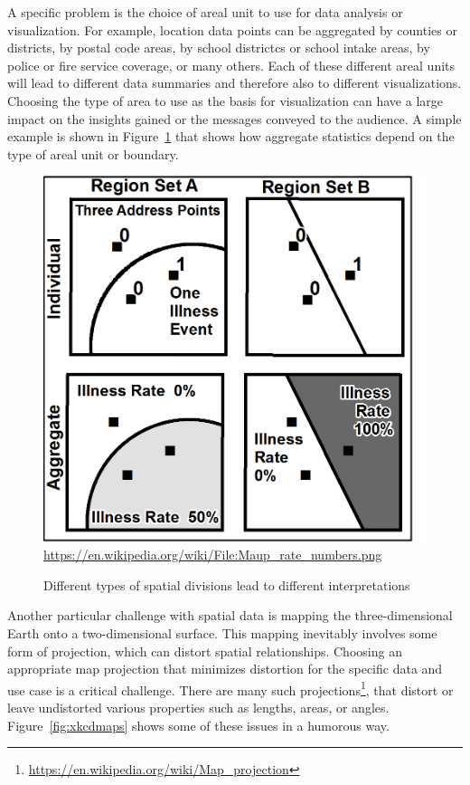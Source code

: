 A specific problem is the choice of areal unit to use for data analysis or visualization. For example, location data points can be aggregated by counties or districts, by postal code areas, by school districtcs or school intake areas, by police or fire service coverage, or many others. Each of these different areal units will lead to different data summaries and therefore also to different visualizations. Choosing the type of area to use as the basis for visualization can have a large impact on the insights gained or the messages conveyed to the audience. A simple example is shown in Figure~\ref{fig:maup} that shows how aggregate statistics depend on the type of areal unit or boundary.

\begin{figure}
\centering
\includegraphics[width=.5\textwidth]{Maup_rate_numbers.png} \\

\small \url{https://en.wikipedia.org/wiki/File:Maup_rate_numbers.png}
\caption{Different types of spatial divisions lead to different interpretations} 
\label{fig:maup}
\end{figure}

Another particular challenge with spatial data is mapping the three-dimensional Earth onto a two-dimensional surface. This mapping inevitably involves some form of projection, which can distort spatial relationships. Choosing an appropriate map projection that minimizes distortion for the specific data and use case is a critical challenge. There are many such projections\footnote{\url{https://en.wikipedia.org/wiki/Map_projection}}, that distort or leave undistorted various properties such as lengths, areas, or angles. Figure~\ref{fig:xkcdmaps} shows some of these issues in a humorous way.


